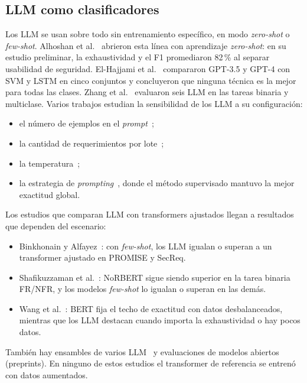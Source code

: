 \documentclass[conference]{IEEEtran}
\begin{document}
\subsection{LLM como clasificadores}
Los LLM se usan sobre todo sin entrenamiento específico, en modo \emph{zero-shot} o \emph{few-shot}. Alhoshan et al.~\cite{Alhoshan2022-ZeroShot,Alhoshan2023-ZeroShot} abrieron esta línea con aprendizaje \emph{zero-shot}: en su estudio preliminar, la exhaustividad y el F1 promediaron 82\,\% al separar usabilidad de seguridad. El-Hajjami et al.~\cite{ElHajjami2023-ChatGPT} compararon GPT-3.5 y GPT-4 con SVM y LSTM en cinco conjuntos y concluyeron que ninguna técnica es la mejor para todas las clases. Zhang et al.~\cite{Zhang2024-Classification} evaluaron seis LLM en las tareas binaria y multiclase. Varios trabajos estudian la sensibilidad de los LLM a su configuración:
\begin{itemize}
  \item el número de ejemplos en el \emph{prompt}~\cite{Tang2025-FewShot};
  \item la cantidad de requerimientos por lote~\cite{Can2025-OneSize};
  \item la temperatura~\cite{Karlsson2025-Exploring,Karlsson2025-Reliable};
  \item la estrategia de \emph{prompting}~\cite{Zhu2026-Prompt}, donde el método supervisado mantuvo la mejor exactitud global.
\end{itemize}

Los estudios que comparan LLM con transformers ajustados llegan a resultados que dependen del escenario:
\begin{itemize}
  \item Binkhonain y Alfayez~\cite{Binkhonain2025-Prompts}: con \emph{few-shot}, los LLM igualan o superan a un transformer ajustado en PROMISE y SecReq.
  \item Shafikuzzaman et al.~\cite{Shafikuzzaman2025-Effectiveness}: NoRBERT sigue siendo superior en la tarea binaria FR/NFR, y los modelos \emph{few-shot} lo igualan o superan en las demás.
  \item Wang et al.~\cite{Wang2026-Machine}: BERT fija el techo de exactitud con datos desbalanceados, mientras que los LLM destacan cuando importa la exhaustividad o hay pocos datos.
\end{itemize}
También hay ensambles de varios LLM~\cite{Kassab2025-EnsembleLLM} y evaluaciones de modelos abiertos~\cite{Alhoshan2025-GenLLM,Sakib2025-Benchmark} (preprints). En ninguno de estos estudios el transformer de referencia se entrenó con datos aumentados.
\end{document}
